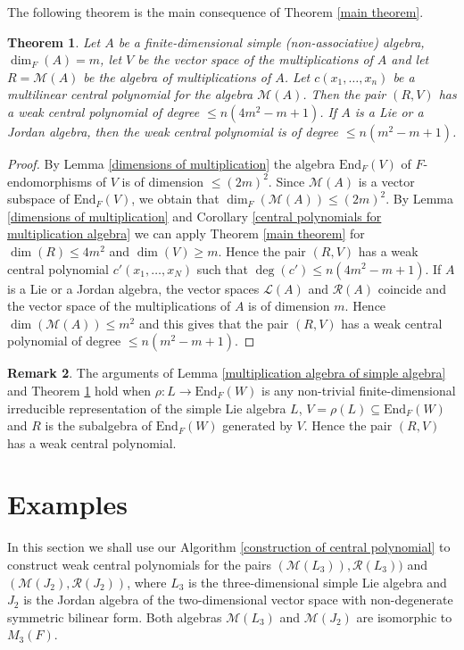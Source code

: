 \documentclass[10]{amsart}
\newtheorem{theorem}{Theorem}[section]
\theoremstyle{definition}
\newtheorem{remark}[theorem]{Remark}
\begin{document}
The following theorem is the main consequence of Theorem \ref{main theorem}.

\begin{theorem}\label{main corollary}
Let $A$ be a finite-dimensional simple (non-associative) algebra, $\dim_F(A)=m$, let $V$ be the vector space of the multiplications of $A$
and let $R={\mathcal M}(A)$ be the algebra of multiplications of $A$.
Let $c(x_1,\ldots,x_n)$ be a multilinear central polynomial for the algebra ${\mathcal M}(A)$.
Then the pair $(R,V)$ has a weak central polynomial of degree $\leq n(4m^2-m+1)$.
If $A$ is a Lie or a Jordan algebra, then the weak central polynomial is of degree $\leq n(m^2-m+1)$.
\end{theorem}

\begin{proof}
By Lemma \ref{dimensions of multiplication} the algebra $\text{End}_F(V)$ of $F$-endomorphisms of $V$ is of dimension $\leq (2m)^2$.
Since ${\mathcal M}(A)$ is a vector subspace of $\text{End}_F(V)$, we obtain that $\dim_F({\mathcal M}(A))\leq (2m)^2$.
By Lemma \ref{dimensions of multiplication} and Corollary \ref{central polynomials for multiplication algebra}
we can apply Theorem \ref{main theorem} for $\dim(R)\leq 4m^2$ and $\dim(V)\geq m$. Hence the pair $(R,V)$ has a weak central polynomial $c'(x_1,\ldots,x_N)$
such that $\deg(c')\leq n(4m^2-m+1)$. If $A$ is a Lie or a Jordan algebra, the vector spaces ${\mathcal L}(A)$ and ${\mathcal R}(A)$ coincide and
the vector space of the multiplications of $A$ is of dimension $m$. Hence $\dim({\mathcal M}(A))\leq m^2$ and this gives that the pair $(R,V)$ has a weak central polynomial of degree $\leq n(m^2-m+1)$.
\end{proof}

\begin{remark}\label{work for Lie algebras}
The arguments of Lemma \ref{multiplication algebra of simple algebra} and Theorem \ref{main corollary}
hold when $\rho:L\to \text{End}_F(W)$ is any non-trivial finite-dimensional irreducible representation of the simple Lie algebra $L$,
$V=\rho(L)\subseteq\text{End}_F(W)$ and $R$ is the subalgebra of $\text{End}_F(W)$ generated by $V$. Hence the pair $(R,V)$ has a weak central polynomial.
\end{remark}

\section{Examples}
In this section we shall use our Algorithm \ref{construction of central polynomial} to construct weak central polynomials for the pairs $({\mathcal M}(L_3)),{\mathcal R}(L_3))$
and $({\mathcal M}(J_2),{\mathcal R}(J_2))$, where $L_3$ is the three-dimensional simple Lie algebra
and $J_2$ is the Jordan algebra of the two-dimensional vector space with non-degenerate symmetric bilinear form. Both algebras ${\mathcal M}(L_3)$ and ${\mathcal M}(J_2)$ are isomorphic to $M_3(F)$.
\end{document}
